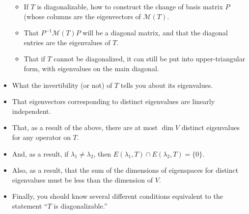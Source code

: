 \documentclass[12pt,letterpaper]{article}
\newcommand{\M}{\mathcal{M}}
\begin{document}
\begin{itemize}
\begin{itemize}
 \item If $T$ is diagonalizable, how to construct the change of basis matrix $P$ (whose columns are the eigenvectors of $\M(T)$. 
 \item That $P^{-1}\M(T)P$ will be a diagonal matrix, and that the diagonal entries are the eigenvalues of $T$.
 \item That if $T$ cannot be diagonalized, it can still be put into upper-triangular form, with eigenvalues on the main diagonal.
\end{itemize}
\item What the invertibility (or not) of $T$ tells you about its eigenvalues.
\item That eigenvectors corresponding to distinct eigenvalues are linearly independent.
\item That, as a result of the above, there are at most $\dim V$ distinct eigenvalues for any operator on $T$.
\item And, as a result, if $\lambda_1\neq \lambda_2$, then $E(\lambda_1,T)\cap E(\lambda_2, T) = \{0\}$.
\item Also, as a result, that the sum of the dimensions of eigenspaces for distinct eigenvalues must be less than the dimension of $V$.
\item Finally, you should know several different conditions equivalent to the statement ``$T$ is diagonalizable.''





\end{itemize}
\end{document}
